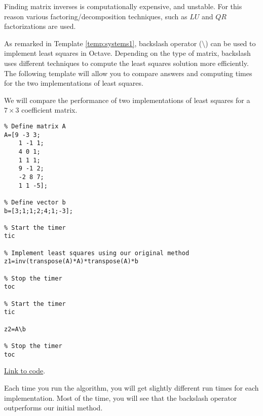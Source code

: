 \documentclass{ximera}
\begin{document}
\begin{warning}
    Finding matrix inverses is computationally expensive, and unstable.  For this reason various factoring/decomposition techniques, such as $LU$ and $QR$ factorizations are used.  
\end{warning}

As remarked in Template \ref{temp:systems1}, backslash operator ($\setminus$) can be used to implement least squares in Octave.  Depending on the type of matrix, backslash uses different techniques to compute the least squares solution more efficiently.  The following template will allow you to compare answers and computing times for the two implementations of least squares.

\begin{template}\label{temp:LeastSquaresComp}
We will compare the performance of two implementations of least squares for a $7\times 3$ coefficient matrix.

    \begin{verbatim}
% Define matrix A
A=[9 -3 3;
    1 -1 1;
    4 0 1;
    1 1 1; 
    9 -1 2;
    -2 8 7;
    1 1 -5];
        
% Define vector b
b=[3;1;1;2;4;1;-3];

% Start the timer
tic

% Implement least squares using our original method
z1=inv(transpose(A)*A)*transpose(A)*b

% Stop the timer
toc

% Start the timer
tic

z2=A\b

% Stop the timer
toc
    \end{verbatim}

\href{https://sagecell.sagemath.org/?z=eJx9TkFqwzAQvAv0h7kE0oKgslPaYHww9NJzjkkPsrtNBJbkSusQ8vpYxCnNod1Zlh12htkF3ujLeoIzHO0JjRRNvV1DlSgrKTCVhtLQM1nh6WfXGRWuZJ1VxXxRBV7x8kumnj9mlkuKxS32SB2HiFaKtt6WlZ5QVKtpqjI7snLDJjL4QGDrKErBtrte3t3QkyPP6MkkRvoeTaSEMVm_RxgjQrR7600PR3wIn1KcdW39ccnR-DSERMvm4XHqO97ecsNwFxu6_x86F3Wz-9t8Af-UXbs=&lang=octave&interacts=eJyLjgUAARUAuQ==}{Link to code}.   

Each time you run the algorithm, you will get slightly different run times for each implementation.  Most of the time, you will see that the backslash operator outperforms our initial method. 
\end{template}
\end{document}
